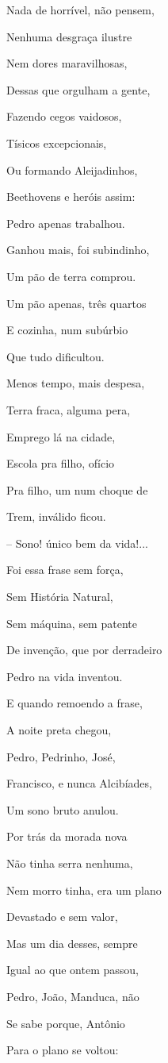 Nada de horrível, não pensem,

Nenhuma desgraça ilustre

Nem dores maravilhosas,

Dessas que orgulham a gente,

Fazendo cegos vaidosos,

Tísicos excepcionais,

Ou formando Aleijadinhos,

Beethovens e heróis assim:

Pedro apenas trabalhou.

Ganhou mais, foi subindinho,

Um pão de terra comprou.

Um pão apenas, três quartos

E cozinha, num subúrbio

Que tudo dificultou.

Menos tempo, mais despesa,

Terra fraca, alguma pera,

Emprego lá na cidade,

Escola pra filho, ofício

Pra filho, um num choque de

Trem, inválido ficou.

-- Sono! único bem da vida!...

Foi essa frase sem força,

Sem História Natural,

Sem máquina, sem patente

De invenção, que por derradeiro

Pedro na vida inventou.

E quando remoendo a frase,

A noite preta chegou,

Pedro, Pedrinho, José,

Francisco, e nunca Alcibíades,

Um sono bruto anulou.

Por trás da morada nova

Não tinha serra nenhuma,

Nem morro tinha, era um plano

Devastado e sem valor,

Mas um dia desses, sempre

Igual ao que ontem passou,

Pedro, João, Manduca, não

Se sabe porque, Antônio

Para o plano se voltou:

